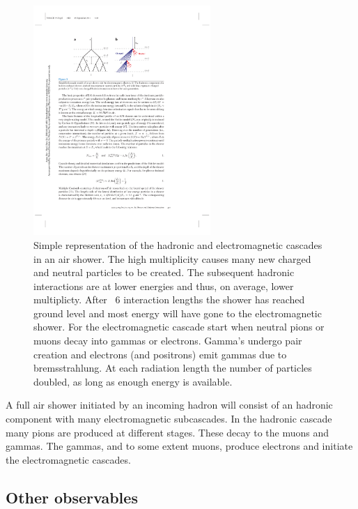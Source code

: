 \begin{figure}
    \centering
    \includegraphics[width=0.6\textwidth]
                    {plots/cosmic-rays/schematic_shower}
    \caption{Simple representation of the hadronic and electromagnetic cascades in an air shower. The high multiplicity causes many new charged and neutral particles to be created. The subsequent hadronic interactions are at lower energies and thus, on average, lower multiplicty. After ~6 interaction lengths the shower has reached ground level and most energy will have gone to the electromagnetic shower. For the electromagnetic cascade start when neutral pions or muons decay into gammas or electrons. Gamma's undergo pair creation and electrons (and positrons) emit gammas due to bremsstrahlung. At each radiation length the number of particles doubled, as long as enough energy is available. \cite{engel2011eas}}
    \label{fig:schematic_shower}
\end{figure}

A full air shower initiated by an incoming hadron will consist of an hadronic component with many electromagnetic subcascades. In the hadronic cascade many pions are produced at different stages. These decay to the muons and gammas. The gammas, and to some extent muons, produce electrons and initiate the electromagnetic cascades.


\subsection{Other observables}
\label{sec:other_observables}

